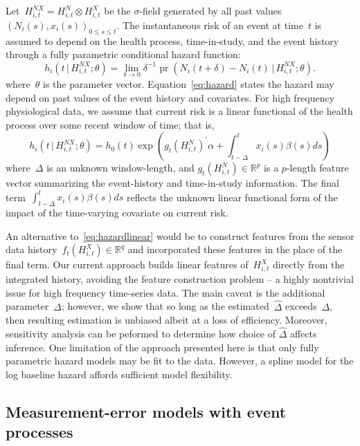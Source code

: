 \documentclass[11pt]{amsart}
\def\pr{\mathop{\text{pr}}\nolimits}
\def\pr{\mathop{\text{pr}}\nolimits}
\def\given{\, | \,}
\def\Given{\, \big | \,}
\begin{document}
Let~$H_{i,t}^{NX} = H_{i,t}^{N} \otimes H_{i,t}^{X}$ be the $\sigma$-field
generated by all past values~$(N_i (s), x_i (s))_{0 \leq s \leq t}$.
The instantaneous risk of an event at time~$t$ is assumed to depend on
the health process, time-in-study, and the event history through a
fully parametric conditional hazard function:
\begin{equation}
\label{eq:hazard}
h_i \left( t \Given H_{i,t}^{NX} ; \theta \right) =
\lim_{\delta \to 0} \delta^{-1} \pr \left( N_i(t+\delta) - N_i(t)
  \given H_{i,t}^{NX}; \theta \right).
\end{equation}
where~$\theta$ is the parameter vector. Equation~\eqref{eq:hazard}
states the hazard may depend on past values of the event history and
covariates.  For high frequency physiological data, we assume that 
current risk is a linear functional of the health process over some
recent window of time; that is, 
\begin{equation}
\label{eq:hazardlinear}
h_i \left( t \given  H_{i,t}^{NX} ; \theta \right) = 
h_0 (t) \exp \left( g_t \left( H_{i,t}^{N} \right)^{\prime} \alpha
  + \int_{t-\Delta}^t x_i (s) \beta(s) ds  \right)
\end{equation}
where~$\Delta$ is an unknown window-length, and $g_t( H_{i,t}^N ) \in
\mathbb{R}^p$ is a $p$-length feature vector summarizing the
event-history and time-in-study information. The final
term~$\int_{t-\Delta}^t x_i(s) \beta(s) ds$ reflects the unknown
linear functional form of the impact of the time-varying covariate on
current risk.   

An alternative to~\eqref{eq:hazardlinear} would be to construct
features from the sensor data history~$f_t ( H_{i,t}^{X}) \in
\mathbb{R}^q$ and incorporated these features in the place of the
final term. Our current approach builds linear features of~$H_{i,t}^X$
directly from the integrated history, avoiding the feature
construction problem -- a highly nontrivial issue for high frequency
time-series data.  The main caveat is the additional
parameter~$\Delta$; however, we show that so long as the
estimated~$\hat \Delta$ exceeds~$\Delta$, then resulting estimation is
unbiased albeit at a loss of efficiency.  Moreover, sensitivity
analysis can be peformed to determine how choice of $\hat \Delta$
affects inference.  One limitation of the approach presented here is
that only fully parametric hazard models may be fit to the data.
However, a spline model for the log baseline hazard affords sufficient
model flexibility.

\subsection{Measurement-error models with event processes}
\end{document}
